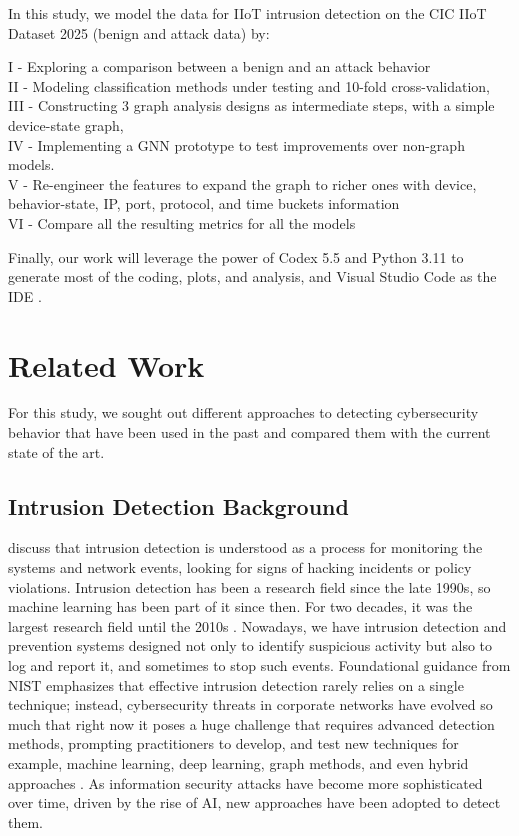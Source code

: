 \documentclass[final,5p,times,twocolumn]{elsarticle}
\begin{document}
In this study, we model the data for IIoT intrusion detection on the CIC IIoT Dataset 2025 (benign and attack data) by:

\begin{flushleft}
I - Exploring a comparison between a benign and an attack behavior\\
II - Modeling classification methods under testing and 10-fold cross-validation,\\
III - Constructing 3 graph analysis designs as intermediate steps, with a simple device-state graph,\\
IV -  Implementing a GNN prototype to test improvements over non-graph models.\\
V - Re-engineer the features to expand the graph to richer ones with device, behavior-state, IP, port, protocol, and time buckets information\\

VI - Compare all the resulting metrics for all the models
\end{flushleft}

Finally, our work will leverage the power of Codex 5.5 and Python 3.11 to generate most of the coding, plots, and analysis, and Visual Studio Code as the IDE \citep{openai_gpt54_2026,vscode_2026}. 

\section{Related Work}
\label{sec:related_work}

For this study, we sought out different approaches to detecting cybersecurity behavior that have been used in the past and compared them with the current state of the art.

\subsection{Intrusion Detection Background}

\cite{scarfone2007guide} discuss that intrusion detection is understood as a process for monitoring the systems and network events, looking for signs of hacking incidents or policy violations. Intrusion detection has been a research field since the late 1990s, so machine learning has been part of it since then. For two decades, it was the largest research field until the 2010s \citep{gokstorp_machine_2026}. Nowadays, we have intrusion detection and prevention systems designed not only to identify suspicious activity but also to log and report it, and sometimes to stop such events. Foundational guidance from NIST \citep{scarfone2007guide} emphasizes that effective intrusion detection rarely relies on a single technique; instead, cybersecurity threats in corporate networks have evolved so much that right now it poses a huge challenge that requires advanced detection methods, prompting practitioners to develop, and test new techniques for example, machine learning, deep learning, graph methods, and even hybrid approaches \citep{hwang2026cgllm,alharthi2025comparative,bilot2023graph}. As information security attacks have become more sophisticated over time, driven by the rise of AI, new approaches have been adopted to detect them.
\end{document}
